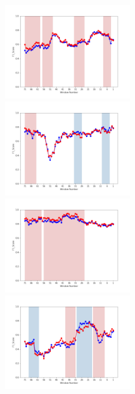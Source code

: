 \documentclass[11pt]{jreport}
\begin{document}
\begin{figure}[H]
\begin{minipage}{\textwidth}
\vspace{0.08\textheight}
\begin{center}
    \includegraphics[width=0.495\textwidth]{Uenaka_fig/RQ1_result/Nova_review_F1.pdf}
    \includegraphics[width=0.495\textwidth]{Uenaka_fig/RQ1_result/Neutron_review_F1.pdf}
    \includegraphics[width=0.495\textwidth]{Uenaka_fig/RQ1_result/Cinder_review_F1.pdf}
    \includegraphics[width=0.495\textwidth]{Uenaka_fig/RQ1_result/Keystone_review_F1.pdf}

\end{center}
\end{minipage}
\end{figure}
\end{document}
